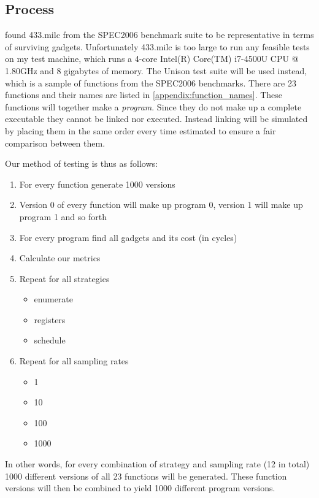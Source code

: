 \subsection{Process}

\textcite{large-scale-automated} found 433.milc from the SPEC2006 benchmark suite to be
representative in terms of surviving gadgets. Unfortunately 433.milc is too large to run
any feasible tests on my test machine, which runs a 4-core Intel(R) Core(TM) i7-4500U CPU
@ 1.80GHz and 8 gigabytes of memory. The Unison test suite will be used instead, which is
a sample of functions from the SPEC2006 benchmarks. There are 23 functions and their names
are listed in \ref{appendix:function_names}. These functions will together make a
\textit{program}. Since they do not make up a complete executable they cannot be linked
nor executed. Instead linking will be simulated by placing them in the same order every time
estimated to ensure a fair comparison between them.

Our method of testing is thus as follows:

\begin{enumerate}
	\item For every function generate 1000 versions
	\item Version 0 of every function will make up program 0, version 1 will make up program
		1 and so forth
	\item For every program find all gadgets and its cost (in cycles)
	\item Calculate our metrics
	\item Repeat for all strategies
		\begin{itemize}
			\item enumerate
			\item registers
			\item schedule
		\end{itemize}
	\item Repeat for all sampling rates
		\begin{itemize}
			\item 1
			\item 10
			\item 100
			\item 1000
		\end{itemize}
\end{enumerate}

In other words, for every combination of strategy and sampling rate (12 in total) 1000
different versions of all 23 functions will be generated. These function versions will
then be combined to yield 1000 different program versions.
